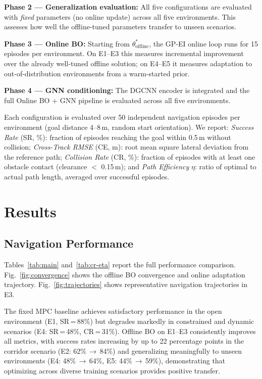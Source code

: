 \documentclass[conference]{IEEEtran}
\begin{document}
\textbf{Phase 2 — Generalization evaluation:} All five configurations are evaluated with \emph{fixed} parameters (no online update) across all five environments. This assesses how well the offline-tuned parameters transfer to unseen scenarios.

\textbf{Phase 3 — Online BO:} Starting from $\theta^*_{\text{offline}}$, the GP-EI online loop runs for 15 episodes per environment. On E1--E3 this measures incremental improvement over the already well-tuned offline solution; on E4--E5 it measures adaptation to out-of-distribution environments from a warm-started prior.

\textbf{Phase 4 — GNN conditioning:} The DGCNN encoder is integrated and the full Online BO + GNN pipeline is evaluated across all five environments.

Each configuration is evaluated over 50 independent navigation episodes per environment (goal distance 4--8\,m, random start orientation). We report: \textit{Success Rate} (SR, \%): fraction of episodes reaching the goal within 0.5\,m without collision; \textit{Cross-Track RMSE} (CE, m): root mean square lateral deviation from the reference path; \textit{Collision Rate} (CR, \%): fraction of episodes with at least one obstacle contact (clearance $<$ 0.15\,m); and \textit{Path Efficiency} $\eta$: ratio of optimal to actual path length, averaged over successful episodes.

\section{Results}
\label{sec:results}

\subsection{Navigation Performance}

Tables~\ref{tab:main} and~\ref{tab:cr-eta} report the full performance comparison. Fig.~\ref{fig:convergence} shows the offline BO convergence and online adaptation trajectory. Fig.~\ref{fig:trajectories} shows representative navigation trajectories in E3.

The fixed MPC baseline achieves satisfactory performance in the open environment (E1, SR\,=\,88\%) but degrades markedly in constrained and dynamic scenarios (E4: SR\,=\,48\%, CR\,=\,31\%). Offline BO on E1--E3 consistently improves all metrics, with success rates increasing by up to 22 percentage points in the corridor scenario (E2: 62\%\,$\to$\,84\%) and generalizing meaningfully to unseen environments (E4: 48\%\,$\to$\,64\%, E5: 44\%\,$\to$\,59\%), demonstrating that optimizing across diverse training scenarios provides positive transfer.
\end{document}
